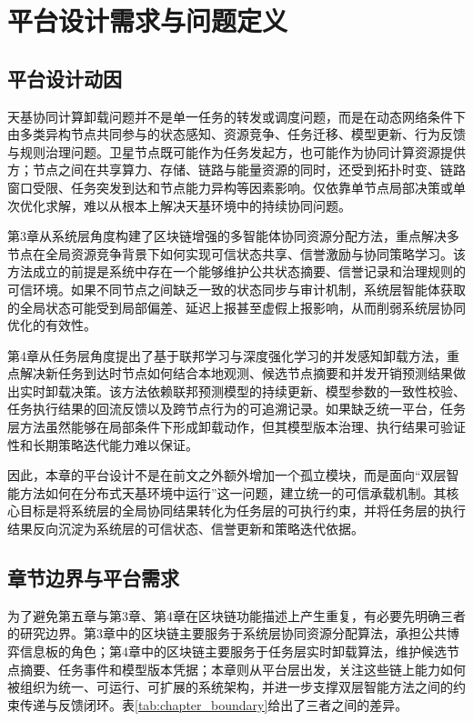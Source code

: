 \section{平台设计需求与问题定义}
\label{sec:platform_requirement}

\subsection{平台设计动因}

天基协同计算卸载问题并不是单一任务的转发或调度问题，而是在动态网络条件下由多类异构节点共同参与的状态感知、资源竞争、任务迁移、模型更新、行为反馈与规则治理问题。卫星节点既可能作为任务发起方，也可能作为协同计算资源提供方；节点之间在共享算力、存储、链路与能量资源的同时，还受到拓扑时变、链路窗口受限、任务突发到达和节点能力异构等因素影响。仅依靠单节点局部决策或单次优化求解，难以从根本上解决天基环境中的持续协同问题。

第3章从系统层角度构建了区块链增强的多智能体协同资源分配方法，重点解决多节点在全局资源竞争背景下如何实现可信状态共享、信誉激励与协同策略学习。该方法成立的前提是系统中存在一个能够维护公共状态摘要、信誉记录和治理规则的可信环境。如果不同节点之间缺乏一致的状态同步与审计机制，系统层智能体获取的全局状态可能受到局部偏差、延迟上报甚至虚假上报影响，从而削弱系统层协同优化的有效性。

第4章从任务层角度提出了基于联邦学习与深度强化学习的并发感知卸载方法，重点解决新任务到达时节点如何结合本地观测、候选节点摘要和并发开销预测结果做出实时卸载决策。该方法依赖联邦预测模型的持续更新、模型参数的一致性校验、任务执行结果的回流反馈以及跨节点行为的可追溯记录。如果缺乏统一平台，任务层方法虽然能够在局部条件下形成卸载动作，但其模型版本治理、执行结果可验证性和长期策略迭代能力难以保证。

因此，本章的平台设计不是在前文之外额外增加一个孤立模块，而是面向“双层智能方法如何在分布式天基环境中运行”这一问题，建立统一的可信承载机制。其核心目标是将系统层的全局协同结果转化为任务层的可执行约束，并将任务层的执行结果反向沉淀为系统层的可信状态、信誉更新和策略迭代依据。

\subsection{章节边界与平台需求}

为了避免第五章与第3章、第4章在区块链功能描述上产生重复，有必要先明确三者的研究边界。第3章中的区块链主要服务于系统层协同资源分配算法，承担公共博弈信息板的角色；第4章中的区块链主要服务于任务层实时卸载算法，维护候选节点摘要、任务事件和模型版本凭据；本章则从平台层出发，关注这些链上能力如何被组织为统一、可运行、可扩展的系统架构，并进一步支撑双层智能方法之间的约束传递与反馈闭环。表\ref{tab:chapter_boundary}给出了三者之间的差异。

